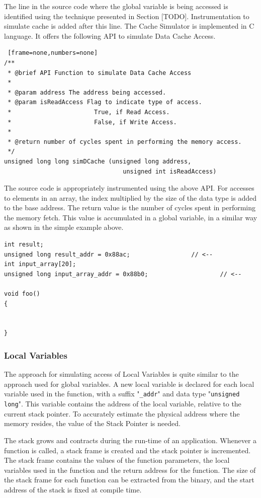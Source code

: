 The line in the source code where the global variable is being accessed is identified using the technique presented in Section [TODO]. Instrumentation to simulate cache is added after this line. The Cache Simulator is implemented in C language. It offers the following API to simulate Data Cache Access.

\begin{lstlisting} [frame=none,numbers=none]
/**
 * @brief API Function to simulate Data Cache Access
 * 
 * @param address The address being accessed.
 * @param isReadAccess Flag to indicate type of access.
 * 					     True, if Read Access.
 * 					     False, if Write Access.
 *
 * @return number of cycles spent in performing the memory access.
 */ 
unsigned long long simDCache (unsigned long address, 
							     unsigned int isReadAccess)
\end{lstlisting}

The source code is appropriately instrumented using the above API. For accesses to elements in an array, the index multiplied by the size of the data type is added to the base address. The return value is the number of cycles spent in performing the memory fetch. This value is accumulated in a global variable, in a similar way as shown in the simple example above.

\begin{lstlisting}
int result;
unsigned long result_addr = 0x88ac;					// <--
int input_array[20];
unsigned long input_array_addr = 0x88b0;					// <--

void foo()
{
	
	
}
\end{lstlisting}

\subsubsection{Local Variables}
The approach for simulating access of Local Variables is quite similar to the approach used for global variables. A new local variable is declared for each local variable used in the function, with a suffix "\texttt{\_addr}" and data type "\texttt{unsigned long}". This variable contains the address of the local variable, relative to the current stack pointer. To accurately estimate the physical address where the memory resides, the value of the Stack Pointer is needed.

The stack grows and contracts during the run-time of an application. Whenever a function is called, a stack frame is created and the stack pointer is incremented. The stack frame contains the values of the function parameters, the local variables used in the function and the return address for the function. The size of the stack frame for each function can be extracted from the binary, and the start address of the stack is fixed at compile time. 

